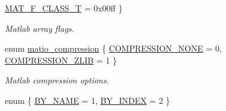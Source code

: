 \begin{DoxyCompactItemize}
\hyperlink{group__MAT_ggab9d6ef9e3ddca78a317b173f01d53fbba3a88beaec448e0485ffe21b18a540c1d}{MAT\_\-F\_\-CLASS\_\-T} =  0x00ff
 \}
\begin{DoxyCompactList}\small\item\em Matlab array flags. \item\end{DoxyCompactList}\item 
enum \hyperlink{group__MAT_ga768c318af97bd2567758ecb001ceb7f4}{matio\_\-compression} \{ \hyperlink{group__MAT_gga768c318af97bd2567758ecb001ceb7f4ac549b871996d1ef05d40056bf5bb52e5}{COMPRESSION\_\-NONE} =  0, 
\hyperlink{group__MAT_gga768c318af97bd2567758ecb001ceb7f4a1f453c9a2c01b52294b37a1226837f86}{COMPRESSION\_\-ZLIB} =  1
 \}
\begin{DoxyCompactList}\small\item\em Matlab compression options. \item\end{DoxyCompactList}\item 
enum \{ \hyperlink{group__MAT_gga06fc87d81c62e9abb8790b6e5713c55ba8938378c70879fe916177141cce0417e}{BY\_\-NAME} =  1, 
\hyperlink{group__MAT_gga06fc87d81c62e9abb8790b6e5713c55ba5f4d5606de1ec27f80f4a50186909005}{BY\_\-INDEX} =  2
 \}
\end{DoxyCompactItemize}
